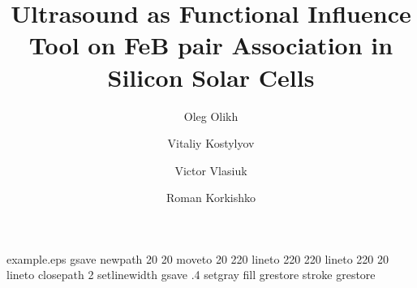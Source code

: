 %
%
%
%
%
\begin{filecontents*}{example.eps}
gsave
newpath
  20 20 moveto
  20 220 lineto
  220 220 lineto
  220 20 lineto
closepath
2 setlinewidth
gsave
  .4 setgray fill
grestore
stroke
grestore
\end{filecontents*}
%
\RequirePackage{fix-cm}
%
\documentclass[smallextended]{svjour3}       %
%
\smartqed  %
%
\usepackage{graphicx}
\usepackage{amsmath}
%
%
%
%
%


\title{Ultrasound as Functional Influence Tool on FeB pair Association in Silicon Solar Cells%
}


\author{Oleg Olikh         \and
        Vitaliy Kostylyov \and
        Victor Vlasiuk \and
        Roman Korkishko
}



